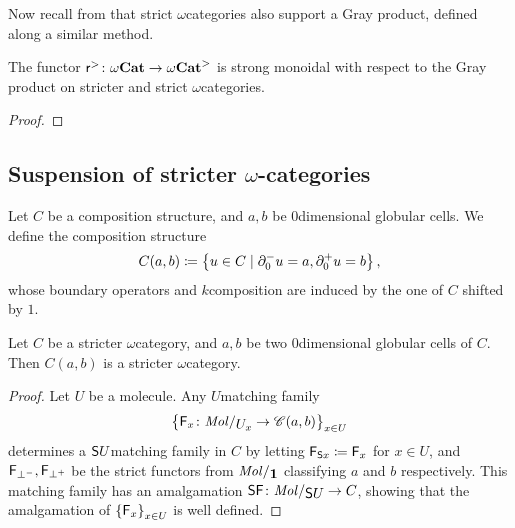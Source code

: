 

Now recall from \cite[Appendice A]{ara2020joint} that strict \( \omega \)\nbd categories also support a Gray product, defined along a similar method.

\begin{prop} \label{prop:reflection_to_stricter_monoidal}
    The functor \( \mathsf{r}^{>} \colon {\omega\mathbf{Cat}} \to {\omega\mathbf{Cat}}^> \) is strong monoidal with respect to the Gray product on stricter and strict \( \omega \)\nbd categories.
\end{prop}
\begin{proof}
\end{proof}

\subsection{Suspension of stricter \texorpdfstring{$\omega$}{ω}-categories}

\begin{dfn} 
    Let \( C \) be a composition structure, and \( a, b \) be \( 0 \)\nbd dimensional globular cells.
    We define the composition structure
    \begin{equation*}
        C(a, b) \coloneqq \left\{ {u \in C \mid \partial_{0}^{-} u = a, \partial_{0}^{+} u = b} \right\},    
    \end{equation*}
    whose boundary operators and \( k \)\nbd composition are induced by the one of \( C \) shifted by \( 1 \).
\end{dfn}

\begin{lem} \label{lem:hom_of_stricter_is_stricter}
    Let \( C \) be a stricter \( \omega \)\nbd category, and \( a, b \) be two \( 0 \)\nbd dimensional globular cells of \( C \).
    Then \( C(a, b) \) is a stricter \( \omega \)\nbd category.
\end{lem}
\begin{proof}
    Let \( U \) be a molecule.
    Any \( U \)\nbd matching family 
    \begin{equation*}
        \set{\F_x \colon \molecin{\imel{U}{x}} \to \C(a, b)}_{x \in U}
    \end{equation*}
    determines a \( \mathsf{S}{U} \)\nbd matching family in \( C \) by letting \( \mathsf{F}_{\mathsf{S}{x}} \coloneqq \mathsf{F}_x \) for \( x \in U \), and \( \mathsf{F}_{\bot^-}, \mathsf{F}_{\bot^+} \) be the strict functors from \( \molecin{\pt} \) classifying \( a \) and \( b \) respectively. 
    This matching family has an amalgamation \( \sus{\F} \colon \molecin{\sus{U}} \to C \), showing that the amalgamation of \( \left\{ {\mathsf{F}_x} \right\}_{x \in U} \) is well defined.
\end{proof}

